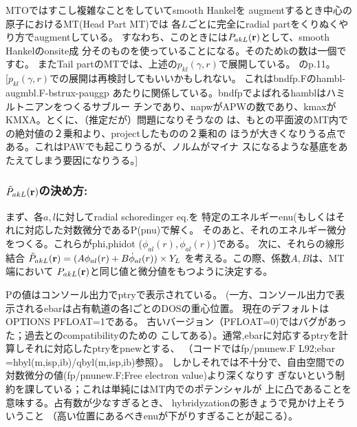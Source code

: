 \documentclass[a4paper,10pt,aip,onecolumn,amsmath,amssymb,floatfix,rmp]{revtex4-1}
\newcommand{\bfr}{{\bf r}}
\begin{document}
MTOではすこし複雑なことをしていてsmooth Hankelを
augmentするとき中心の原子におけるMT(Head Part MT)では
各$L$ごとに完全にradial partをくりぬくやり方でaugmentしている。
すなわち、このときには${P}_{akL}(\bfr)$として、smooth Hankelのonsite成
分そのものを使っていることになる。そのためkの数は一個ですむ。
またTail partのMTでは、上述の$p_{kl}(\gamma,r)$で展開している。
\cite{lmfchap}のp.11。\\


[$p_{kl}(\gamma,r)$での展開は再検討してもいいかもしれない。
これはbndfp.Fのhambl-augmbl.F-bstrux-pauggp
あたりに関係している。bndfpでよばれるhamblはハミルトニアンをつくるサブルー
チンであり、napwがAPWの数であり、kmaxがKMXA。とくに、（推定だが）問題になりそうなの
は、もとの平面波のMT内での絶対値の２乗和より、projectしたものの２乗和の
ほうが大きくなりうる点である。これはPAWでも起こりうるが、ノルムがマイナ
スになるような基底をあたえてしまう要因になりうる。]


\subsubsection{\bf $\tilde{P}_{akL} (\bfr)$の決め方:}
まず、各$a,l$に対してradial schoredinger eq.を
特定のエネルギーenu(もしくはそれに対応した対数微分であるP(pnu)で解く。
そのあと、それのエネルギー微分をつくる。これらがphi,phidot
($\phi_{al}(r),\dot{\phi}_{al}(r)$)である。
次に、それらの線形結合
$\tilde{P}_{akL}(\bfr)=(A\phi_{al}(r)+ B \dot{\phi}_{al}(r))\times Y_L$
を考える。この際、係数$A,B$は、MT端において
${P}_{akL}(\bfr)$と同じ値と微分値をもつように決定する。

Pの値はコンソール出力でptryで表示されている。
(一方、コンソール出力で表示されるebarは占有軌道の各lごとのDOSの重心位置。
現在のデフォルトはOPTIONS PFLOAT=1である。
古いバージョン（PFLOAT=0)ではバグがあった；過去とのcompatibilityのための
こしてある）。通常,ebarに対応するptryを計算しそれに対応したptryをpnewとする、
（コードではfp/pnunew.F L92;ebar =hbyl(m,isp,ib)/qbyl(m,isp,ib)参照）。
しかしそれでは不十分で、自由空間での対数微分の値(fp/pnunew.F;Free electron value)より深くなりす
ぎないという制約を課している；これは単純にはMT内でのポテンシャルが
上に凸であることを意味する。占有数が少なすぎるとき、
hybridyzationの影きょうで見かけ上そういうこと
（高い位置にあるべきenuが下がりすぎることが起こる）。

\end{document}
